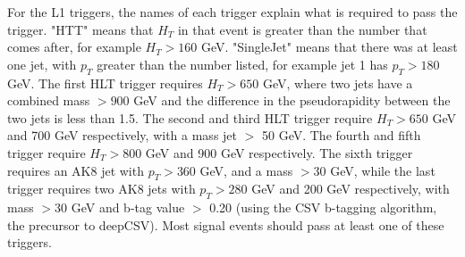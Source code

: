 For the L1 triggers, the names of each trigger explain what is required to pass the trigger. "HTT" means that $H_{T}$ in that event is greater than the number that comes after, for example $H_{T} > 160$ GeV. "SingleJet" means that there was at least one jet, with $p_{T}$ greater than the number listed, for example jet 1 has $p_{T} > 180$ GeV. The first HLT trigger requires $H_{T} > 650$ GeV, where two jets have a combined mass $> 900$ GeV and the difference in the pseudorapidity between the two jets is less than 1.5. The second and third HLT trigger require $H_{T} > 650$ GeV and 700 GeV respectively, with a mass jet $>$ 50 GeV. The fourth and fifth trigger require $H_{T} > 800$ GeV and 900 GeV respectively. The sixth trigger requires an AK8 jet with $p_{T} > 360$ GeV, and a mass $> 30$ GeV, while the last trigger requires two AK8 jets with $p_{T} > 280$ GeV and 200 GeV respectively, with mass $> 30$ GeV and b-tag value $>$ 0.20 (using the CSV b-tagging algorithm, the precursor to deepCSV). Most signal events should pass at least one of these triggers.

